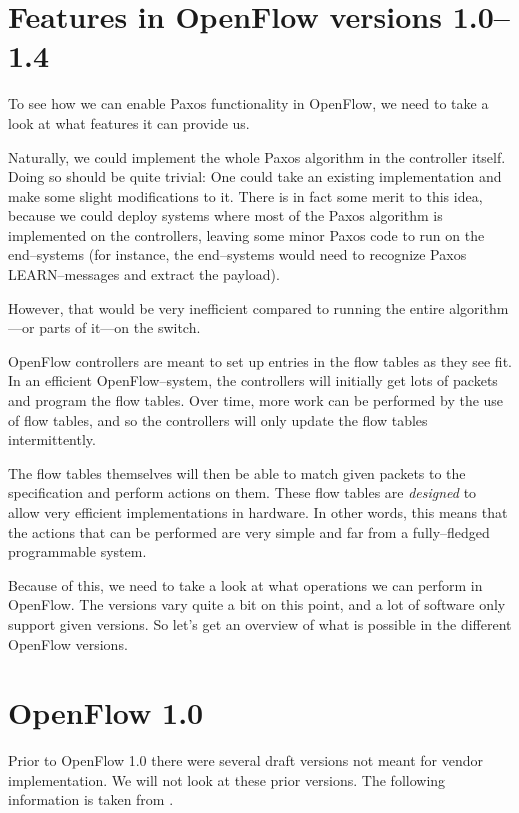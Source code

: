 \section{Features in OpenFlow versions 1.0--1.4}

To see how we can enable Paxos functionality in OpenFlow, we need to take a
look at what features it can provide us.

Naturally, we could implement the whole Paxos algorithm in the controller
itself.  Doing so should be quite trivial: One could take an existing
implementation and make some slight modifications to it.  There is in fact
some merit to this idea, because we could deploy systems where most of the
Paxos algorithm is implemented on the controllers, leaving some minor Paxos
code to run on the end--systems (for instance, the end--systems would need
to recognize Paxos LEARN--messages and extract the payload).

However, that would be very inefficient compared to running the entire
algorithm---or parts of it---on the switch.

OpenFlow controllers are meant to set up entries in the flow tables as they
see fit.  In an efficient OpenFlow--system, the
controllers will initially get lots of packets and program the flow tables.
Over time, more work can be performed by the use of flow tables, and so the
controllers will only update the flow tables intermittently.

The flow tables themselves will then be able to match given
packets to the specification and perform actions on them.  These flow tables
are {\em designed} to allow very efficient implementations in hardware.  In
other words, this means that the actions that can be performed are very
simple and far from a fully--fledged programmable system.

Because of this, we need to take a look at what operations we can perform in
OpenFlow.  The versions vary quite a bit on this point, and a lot of
software only support given versions.  So let's get an overview of what is
possible in the different OpenFlow versions.

\section{OpenFlow 1.0}

Prior to OpenFlow 1.0 there were several draft versions not meant for
vendor implementation.  We will not look at these prior versions.  The
following information is taken from \cite{openflow-1.0.0}.

